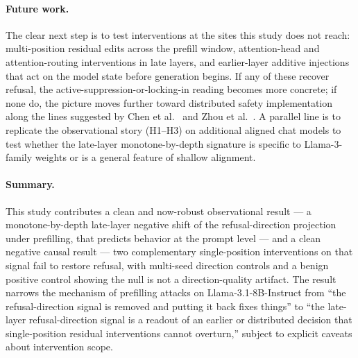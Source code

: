 \documentclass{article}
\begin{document}
\paragraph{Future work.}
The clear next step is to test interventions at the sites this study
does not reach: multi-position residual edits across the prefill window,
attention-head and attention-routing interventions in late layers, and
earlier-layer additive injections that act on the model state before
generation begins. If any of these recover refusal, the
active-suppression-or-locking-in reading becomes more concrete; if none
do, the picture moves further toward distributed safety implementation
along the lines suggested by Chen et al.~\cite{chen2025safetyneurons}
and Zhou et al.~\cite{zhou2025safetyheads}. A parallel line is to
replicate the observational story (H1--H3) on additional aligned chat
models to test whether the late-layer monotone-by-depth signature is
specific to Llama-3-family weights or is a general feature of shallow
alignment.

\paragraph{Summary.}
This study contributes a clean and now-robust observational result --- a
monotone-by-depth late-layer negative shift of the refusal-direction
projection under prefilling, that predicts behavior at the prompt level
--- and a clean negative causal result --- two complementary
single-position interventions on that signal fail to restore refusal,
with multi-seed direction controls and a benign positive control showing
the null is not a direction-quality artifact. The result narrows the
mechanism of prefilling attacks on Llama-3.1-8B-Instruct from ``the
refusal-direction signal is removed and putting it back fixes things''
to ``the late-layer refusal-direction signal is a readout of an earlier
or distributed decision that single-position residual interventions
cannot overturn,'' subject to explicit caveats about intervention
scope.



\end{document}
